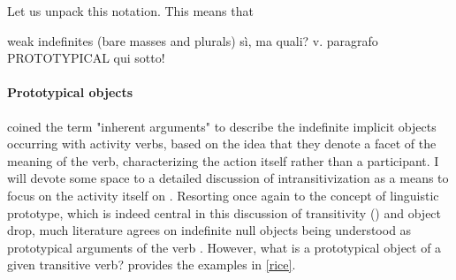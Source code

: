 Let us unpack this notation. This means that








weak indefinites (bare masses and plurals) sì, ma quali? v. paragrafo PROTOTYPICAL qui sotto!

\paragraph{Prototypical objects}

\textcite[122]{vanvalinlapolla1997syntax} coined the term "inherent arguments" to describe the indefinite implicit objects occurring with activity verbs, based on the idea that they denote a facet of the meaning of the verb, characterizing the action itself rather than a participant. I will devote some space to a detailed discussion of intransitivization as a means to focus on the activity itself on . Resorting once again to the concept of linguistic prototype, which is indeed central in this discussion of transitivity () and object drop, much literature agrees on indefinite null objects being understood as prototypical arguments of the verb \parencite{Rice1988, Naess2007, bresnan1978realistic, Melchin2019, Mittwoch2005, Dvorak2017thesis, Levin1993, Lorenzetti2008}. However, what is a prototypical object of a given transitive verb? \textcite[204]{Rice1988} provides the examples in \ref{rice}.

